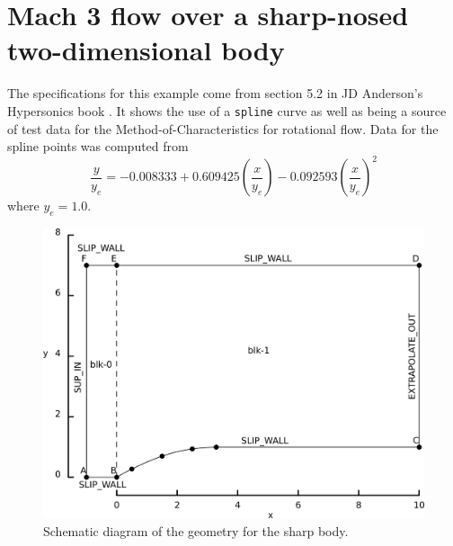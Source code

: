 
\section{Mach 3 flow over a sharp-nosed two-dimensional body}
%
The specifications for this example come from section 5.2
in JD Anderson's Hypersonics book \cite{anderson_89}.
It shows the use of a \texttt{spline} curve as well as being a source
of test data for the Method-of-Characteristics for rotational flow.
Data for the spline points was computed from
$$
\frac{y}{y_e} = -0.008333 + 0.609425 \left( \frac{x}{y_e} \right)
                - 0.092593 \left( \frac{x}{y_e} \right)^2
$$
where $y_e = 1.0$.

\begin{figure}[htbp]
\begin{center}
\includegraphics[width=12cm]{../2D/sharp/sharp.png}
\end{center}
\caption{Schematic diagram of the geometry for the sharp body.}
\label{sharp-geometry-fig}
\end{figure}

